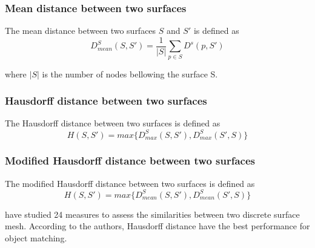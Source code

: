 \subsubsection*{Mean distance between two surfaces}
The mean distance between two surfaces $S$ and $S'$ is defined as 
\begin{equation}
D^S_{mean}(S, S') = \frac{1}{\vert S \vert} \sum_{p \in S}  D^s(p, S') 
\end{equation}

where $\vert S \vert$ is the number of nodes bellowing the surface S.
\subsubsection*{Hausdorff distance between two surfaces}
The Hausdorff distance \citep{huttenlocher_comparing_1993} between two surfaces is defined as 
\begin{equation}
H(S,S') = max \lbrace D^S_{max}(S,S'), D^S_{max}(S',S)\rbrace
\end{equation}
\subsubsection*{Modified Hausdorff distance between two surfaces}
The modified Hausdorff distance between two surfaces is defined as 
\begin{equation}
H(S,S') = max \lbrace D^S_{mean}(S,S'), D^S_{mean}(S',S)\rbrace
\end{equation}

\cite{dubuisson_modified_1994} have studied 24 measures to assess the similarities between two discrete surface mesh. According to the authors, Hausdorff distance have the best performance for object matching.
